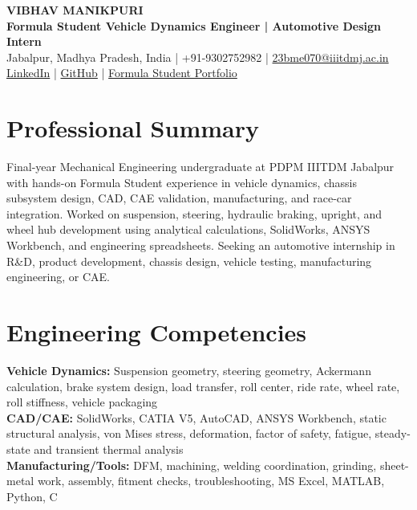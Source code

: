 \documentclass[9pt,a4paper]{extarticle}
\newcommand{\skillcategory}[2]{\textbf{#1:} #2\\[-2pt]}
\begin{document}
\begin{center}
    {\Large \textbf{VIBHAV MANIKPURI}}\\[1pt]
    {\normalsize \textbf{Formula Student Vehicle Dynamics Engineer | Automotive Design Intern}}\\[1pt]
    Jabalpur, Madhya Pradesh, India \;|\; +91-9302752982 \;|\; \href{mailto:23bme070@iiitdmj.ac.in}{23bme070@iiitdmj.ac.in} \\
    \href{https://www.linkedin.com/in/vibhav-manikpuri-7a01192a2/}{LinkedIn} \;|\; \href{https://github.com/vibhavmanikpuri12-dev}{GitHub} \;|\; \href{https://github.com/vibhavmanikpuri12-dev/formula-student-vehicle-dynamics-portfolio}{Formula Student Portfolio}
\end{center}
\vspace{-9pt}

\section*{Professional Summary}
Final-year Mechanical Engineering undergraduate at PDPM IIITDM Jabalpur with hands-on Formula Student experience in vehicle dynamics, chassis subsystem design, CAD, CAE validation, manufacturing, and race-car integration. Worked on suspension, steering, hydraulic braking, upright, and wheel hub development using analytical calculations, SolidWorks, ANSYS Workbench, and engineering spreadsheets. Seeking an automotive internship in R\&D, product development, chassis design, vehicle testing, manufacturing engineering, or CAE.

\section*{Engineering Competencies}
\skillcategory{Vehicle Dynamics}{Suspension geometry, steering geometry, Ackermann calculation, brake system design, load transfer, roll center, ride rate, wheel rate, roll stiffness, vehicle packaging}
\skillcategory{CAD/CAE}{SolidWorks, CATIA V5, AutoCAD, ANSYS Workbench, static structural analysis, von Mises stress, deformation, factor of safety, fatigue, steady-state and transient thermal analysis}
\skillcategory{Manufacturing/Tools}{DFM, machining, welding coordination, grinding, sheet-metal work, assembly, fitment checks, troubleshooting, MS Excel, MATLAB, Python, C}
\end{document}
